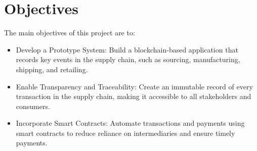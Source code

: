 \section{Objectives}
The main objectives of this project are to:
\begin{itemize}
    \item Develop a Prototype System: Build a blockchain-based application that records key events in the supply chain, such as sourcing, manufacturing, shipping, and retailing.
    \item Enable Transparency and Traceability: Create an immutable record of every transaction in the supply chain, making it accessible to all stakeholders and consumers.
    \item Incorporate Smart Contracts: Automate transactions and payments using smart contracts to reduce reliance on intermediaries and ensure timely payments.
\end{itemize}

